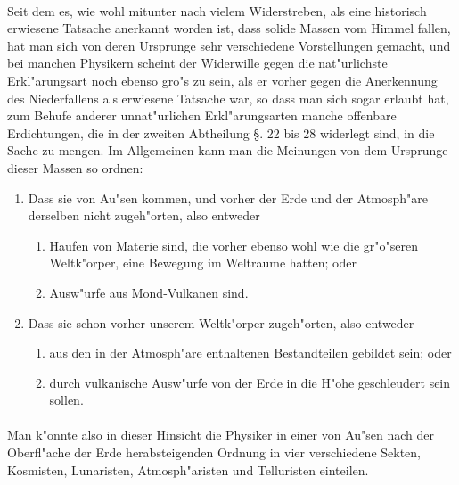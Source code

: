\documentclass[a4paper, 11pt, oneside, polutonikogreek, german]{article}
\begin{document}
\paragraph{}
Seit dem es, wie wohl mitunter nach vielem Widerstreben, als eine historisch erwiesene Tatsache anerkannt worden ist, dass solide Massen vom Himmel fallen, hat man sich von deren Ursprunge sehr verschiedene Vorstellungen gemacht, und bei manchen Physikern scheint der Widerwille gegen die nat"urlichste Erkl"arungsart noch ebenso gro"s zu sein, als er vorher gegen die Anerkennung des Niederfallens als erwiesene Tatsache war, so dass man sich sogar erlaubt hat, zum Behufe anderer unnat"urlichen Erkl"arungsarten manche offenbare Erdichtungen, die in der zweiten Abtheilung §. 22 bis 28 widerlegt sind, in die Sache zu mengen. Im Allgemeinen kann man die Meinungen von dem Ursprunge dieser Massen so ordnen:
\begin{enumerate}
    \item Dass sie von Au"sen kommen, und vorher der Erde und der Atmosph"are derselben nicht zugeh"orten, also entweder
    \begin{enumerate}
        \item Haufen von Materie sind, die vorher ebenso wohl wie die gr"o"seren Weltk"orper, eine Bewegung im Weltraume hatten; oder
        \item Ausw"urfe aus Mond-Vulkanen sind.
    \end{enumerate}
    \item Dass sie schon vorher unserem Weltk"orper zugeh"orten, also entweder
    \begin{enumerate}
        \item aus den in der Atmosph"are enthaltenen Bestandteilen gebildet sein; oder
        \item durch vulkanische Ausw"urfe von der Erde in die H"ohe geschleudert sein sollen.
    \end{enumerate}
\end{enumerate}
\paragraph{}
Man k"onnte also in dieser Hinsicht die Physiker in einer von Au"sen nach der Oberfl"ache der Erde herabsteigenden Ordnung in vier verschiedene Sekten, Kosmisten, Lunaristen, Atmosph"aristen und Telluristen einteilen.
\subsection{}
\end{document}

